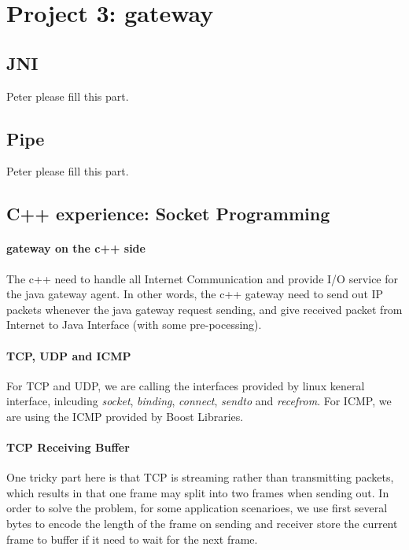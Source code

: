 \documentclass[conference,compsoc]{IEEEtran}
\begin{document}
\section{Project 3: gateway}

	
	\subsection{JNI}
		Peter please fill this part.
	
	\subsection{Pipe}
		Peter please fill this part.
		
	
	\subsection{C++ experience: Socket Programming}
		\paragraph{\textbf{gateway on the c++ side}}
		The c++ need to handle all Internet Communication and provide I/O service for the java gateway agent. In other words, the c++ gateway need to send out IP packets whenever the java gateway request sending, and give received packet from Internet to Java Interface (with some pre-pocessing).
		
		
		\paragraph{\textbf{TCP, UDP and ICMP}}
		For TCP and UDP, we are calling the interfaces provided by linux keneral interface, inlcuding \emph{socket}, \emph{binding}, \emph{connect}, \emph{sendto} and \emph{recefrom}. For ICMP, we are using the ICMP provided by Boost Libraries. 
		\paragraph{\textbf{TCP Receiving Buffer}}
		 One tricky part here is that TCP is streaming rather than transmitting packets, which results in that one frame may split into two frames when sending out. In order to solve the problem, for some application scenarioes, we use first several bytes to encode the length of the frame on sending and receiver store the current frame to buffer if it need to wait for the next frame.
		
\end{document}
